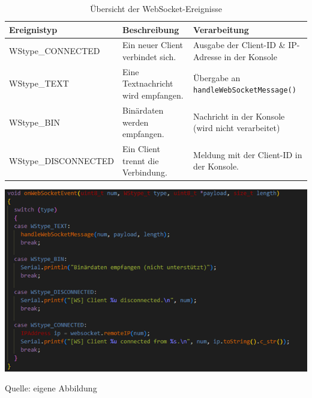 \documentclass[ngerman,12pt,a4paper]{article}
\begin{document}
	\begin{table}[h]
		\centering
		\renewcommand{\arraystretch}{1.2}
		\setlength{\tabcolsep}{8pt}
		\begin{adjustbox}{max width=\textwidth}
    	\begin{tabular}{|l|p{5cm}|p{6cm}|}

		\hline
		\textbf{Ereignistyp} & \textbf{Beschreibung} & \textbf{Verarbeitung} \\
		\hline
		WStype\_CONNECTED & Ein neuer Client verbindet sich. & Ausgabe der Client-ID \& IP-Adresse in der Konsole \\
		\hline
		WStype\_TEXT & Eine Textnachricht wird empfangen. & Übergabe an \texttt{handleWebSocketMessage()} \\
		\hline
		WStype\_BIN & Binärdaten werden empfangen. & Nachricht in der Konsole (wird nicht verarbeitet) \\
		\hline
		WStype\_DISCONNECTED & Ein Client trennt die Verbindung. & Meldung mit der Client-ID in der Konsole. \\
		\hline
	
		\end{tabular}
		\end{adjustbox}
		\caption{Übersicht der WebSocket-Ereignisse}
		\label{tab:websocket-events}
	\end{table} 
	\begin{center}
		\begin{minipage}[t]{\textwidth}
			\includegraphics{Pictures/websocketevents}
			\label{fig:onwebsocketevent}
			\vspace{-10pt}
			\begin{center}
				\par\small Quelle: eigene Abbildung 
			\end{center}
		\end{minipage} \\[0.75cm]
	\end{center}
\end{document}
